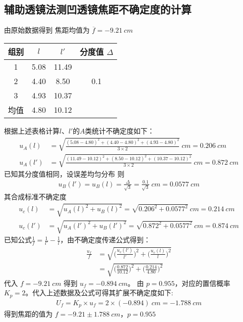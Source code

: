 \documentclass[UTF8]{ctexart}
\begin{document}
\subsection{辅助透镜法测凹透镜焦距不确定度的计算}
由原始数据得到 焦距均值为 $\overline{f} = -9.21 \ cm$   %
\begin{table}[H]
\begin{tabular}{|c|c|c|c|}
\hline
 组别  &  $l$ &  $l'$ & 分度值 $\Delta$   \\
 \hline
  1   & 5.08  & 11.49  &  \multirow{3}{*}{0.1}  \\
\cline{1-3}
  2   &  4.40 & 8.50  & \\
\cline{1-3}
  3   &  4.93 &  10.37  & \\
\hline
均值  &  4.80 & 10.12  &  \\
\hline
\end{tabular}
\end{table}
根据上述表格计算$l$、$l'$的$A$类统计不确定度如下：
\begin{align*}
    u_A(l) 
         &= \sqrt{\frac{(5.08 - 4.80)^2 +
         (4.40 - 4.80)^2 +
         (4.93 - 4.80)^2 }
         { 3\times 2}} \ cm = 0.206 \ cm \\
    u_A(l')
     &= \sqrt{\frac{(11.49 - 10.12 )^2 +
         (8.50 - 10.12)^2 +
         (10.37 - 10.12)^2 }
         { 3\times 2}} \ cm = 0.872 \  cm
\end{align*}
已知其分度值相同，设误差均匀分布 则
\begin{align*}
     u_B(l')  = u_B(l) = \frac{\Delta}{\sqrt{3}} = \frac{0.1}{\sqrt{3}} \ cm= 0.0577 \ cm 
\end{align*}
其合成标准不确定度
\begin{align*}
    u_c(l) &= \sqrt{u_A(l)^2+u_B(l)^2} = \sqrt{0.206^2 + 0.0577^2} \ cm  = 0.214 \ cm \\
    u_c(l') &= \sqrt{u_A(l')^2+u_B(l')^2} = \sqrt{0.872^2 + 0.0577^2} \ cm = 0.874 \ cm
\end{align*}
已知公式$\frac{1}{f} = \frac{1}{l'} - \frac{1}{l} $，由不确定度传递公式得到：
\begin{align*}
    \frac{u_f}{f} &= \sqrt{ \Big(  \frac{u_c(l')}{l'}  \Big)^2 +
    \Big(  \frac{u_c(l)}{l}  \Big)^2 } \\
    &=  \sqrt{ \Big(  \frac{0.872}{10.12}  \Big)^2 +
    \Big(  \frac{0.214}{4.80}  \Big)^2 } 
\end{align*}
代入 $ f = -9.21 \ cm$ 得到 $ u_f = -0.894 \ cm$。
由 $p=0.955$，对应的置信概率 $K_p=2$。代入上述数据及公式可得其扩展不确定度如下:
\begin{align*}
    U_f = K_p \times u_f = 2 \times (-0.894) \ cm = -1.788 \ cm 
\end{align*}
得到焦距的值为 $f = -9.21 \pm 1.788 \ cm$，$p = 0.955$
\end{document}
